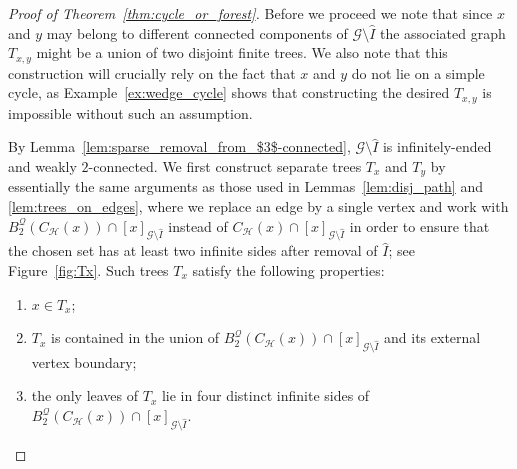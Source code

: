 \documentclass{article}
\theoremstyle{plain}
\theoremstyle{definition}
\newcommand{\cG}{\mathcal{G}}
\newcommand{\cQ}{\mathcal{Q}}
\newcommand{\cH}{\mathcal{H}}
\begin{document}
\begin{proof}[Proof of Theorem~\ref{thm:cycle_or_forest}]
Before we proceed we note that since $x$ and $y$ may belong to different connected components of $\cG\setminus{\widehat{I}}$ the associated graph $T_{x,y}$ might be a union of two disjoint finite trees. We also note that this construction will crucially rely on the fact that $x$ and $y$ do not lie on a simple cycle, as Example~\ref{ex:wedge_cycle} shows that constructing the desired $T_{x,y}$ is impossible without such an assumption.

By Lemma~\ref{lem:sparse_removal_from_$3$-connected}, $\cG\setminus \widehat{I}$ is infinitely-ended and weakly $2$-connected. We first construct separate trees $T_x$ and $T_y$ by essentially the same arguments as those used in Lemmas~\ref{lem:disj_path} and \ref{lem:trees_on_edges}, where we replace an edge by a single vertex and work with $B_2^{\cQ}(C_{\cH}(x))\cap [x]_{\cG\setminus \widehat{I}}$ instead of $C_{\cH}(x)\cap [x]_{\cG\setminus \widehat{I}}$ in order to ensure that the chosen set has at least two infinite sides after removal of $\widehat{I}$; see Figure~\ref{fig:Tx}. Such trees $T_x$ satisfy the following properties:
     \begin{enumerate}
         \item $x\in T_x$;
         \item $T_x$ is contained in the union of $B_2^{\cQ}(C_{\cH}(x))\cap [x]_{\cG\setminus \widehat{I}}$ and its external vertex boundary;
         \item the only leaves of $T_x$ lie in four distinct infinite sides of $B_2^{\cQ}(C_{\cH}(x))\cap [x]_{\cG\setminus \widehat{I}}$.
     \end{enumerate}

\begin{figure}[htb]
\begin{center}
\end{center}
\end{figure}
\end{proof}
\end{document}
